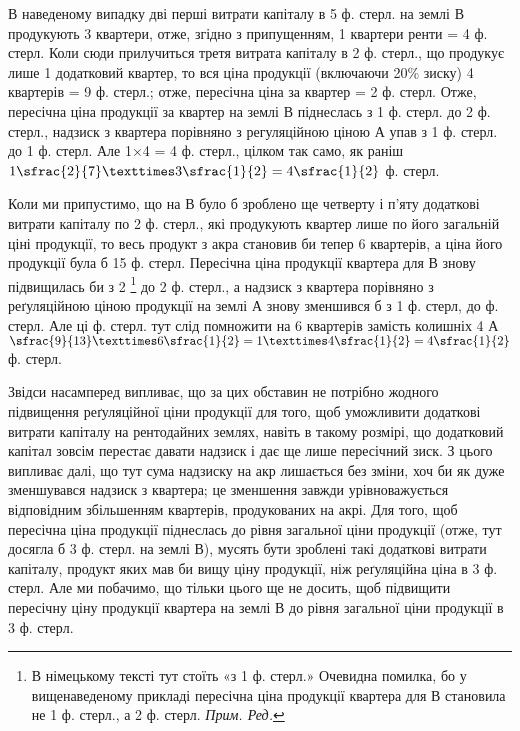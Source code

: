 В наведеному випадку дві перші витрати капіталу в 5 ф. стерл. на землі В
продукують 3 квартери, отже, згідно з припущенням, 1
квартери ренти = 4 ф. стерл. Коли сюди прилучиться третя витрата
капіталу в 2 ф. стерл.,
що продукує лише 1 додатковий квартер, то вся ціна продукції (включаючи 20\%
зиску) 4 квартерів = 9 ф. стерл.; отже, пересічна ціна за
квартер = 2 ф. стерл. Отже, пересічна ціна продукції за квартер на землі В
піднеслась з 1 ф. стерл.
до 2 ф. стерл., надзиск з квартера порівняно з регуляційною ціною А упав
з 1 ф. стерл. до 1 ф. стерл. Але 1×4 = 4 ф.
стерл., цілком так само,
як раніш $1\sfrac{2}{7} × 3\sfrac{1}{2} = 4\sfrac{1}{2}$ ф. стерл.

Коли ми припустимо, що на В було б зроблено ще четверту і п’яту додаткові
витрати капіталу по 2 ф. стерл., які продукують квартер лише по його
загальній ціні продукції, то весь продукт з акра становив би тепер 6 квартерів,
а ціна його продукції була б 15 ф. стерл. Пересічна ціна продукції
квартера для В знову підвищилась би з 2
\footnote*{В німецькому тексті тут стоїть «з 1 ф. стерл.» Очевидна помилка,
бо у вищенаведеному прикладі пересічна ціна продукції квартера для В
становила не 1 ф. стерл., а 2 ф. стерл. \emph{Прим. Ред.}}
до 2 ф. стерл., а надзиск з квартера
порівняно з реґуляційною ціною продукції на землі А знову зменшився
б з 1 ф. стерл, до  ф. стерл. Але ці  ф. стерл. тут слід
помножити на 6 квартерів замість колишніх 4
А $\sfrac{9}{13}×6\sfrac{1}{2} = 1× 4\sfrac{1}{2} = 4\sfrac{1}{2}$ ф. стерл.

Звідси насамперед випливає, що за цих обставин не потрібно жодного підвищення
реґуляційної ціни продукції для того, щоб уможливити додаткові витрати
капіталу на рентодайних землях, навіть в такому розмірі, що додатковий
капітал зовсім перестає давати надзиск і дає ще лише пересічний зиск. З
цього випливає далі, що тут сума надзиску на акр лишається без зміни,
хоч би як дуже зменшувався надзиск з квартера; це зменшення завжди урівноважується
відповідним збільшенням квартерів, продукованих на акрі. Для того,
щоб пересічна ціна продукції піднеслась до рівня загальної ціни продукції (отже,
тут досягла б 3 ф. стерл. на землі В), мусять бути зроблені такі додаткові витрати
капіталу, продукт яких мав би вищу ціну продукції, ніж реґуляційна ціна
в 3 ф. стерл. Але ми побачимо, що тільки цього ще не досить, щоб підвищити
пересічну ціну продукції квартера на землі В до рівня загальної ціни продукції
в 3 ф. стерл.

